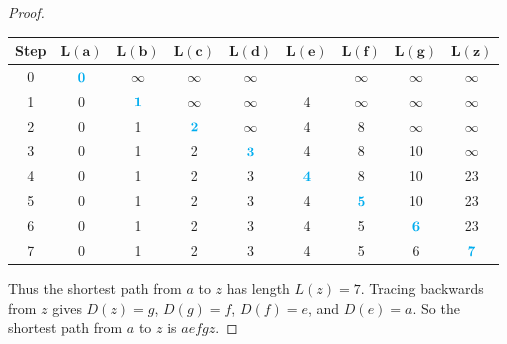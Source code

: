 \documentclass[14pt]{extarticle}
\newcommand{\cy}{\color{cyan}}
\begin{document}
\begin{proof}
\begin{center}
        \begin{tabular}{|c|c|c|c|c|c|c|c|c|}
            \hline
            {\bf \cy Step} & {\cy \(\bm{L(a)}\)} & {\cy\(\bm{L(b)}\)} & {\cy\(\bm{L(c)}\)} & {\cy\(\bm{L(d)}\)} & {\cy\(\bm{L(e)}\)} & {\cy\(\bm{L(f)}\)} & {\cy\(\bm{L(g)}\)} & {\cy\(\bm{L(z)}\)} \\
            \hline
            0              & \({\cy \bm{0}}\)    & \(\infty\)         & \(\infty\)         & \(\infty\)         &                    & \(\infty\)         & \(\infty\)         & \(\infty\)         \\
            1              & 0                   & \({\cy \bm{1}}\)   & \(\infty\)         & \(\infty\)         & 4                  & \(\infty\)         & \(\infty\)         & \(\infty\)         \\
            2              & 0                   & 1                  & \({\cy \bm{2}}\)   & \(\infty\)         & 4                  & 8                  & \(\infty\)         & \(\infty\)         \\
            3              & 0                   & 1                  & 2                  & \({\cy \bm{3}}\)   & 4                  & 8                  & 10                 & \(\infty\)         \\
            4              & 0                   & 1                  & 2                  & 3                  & \({\cy \bm{4}}\)   & 8                  & 10                 & 23                 \\
            5              & 0                   & 1                  & 2                  & 3                  & 4                  & \({\cy \bm{5}}\)   & 10                 & 23                 \\
            6              & 0                   & 1                  & 2                  & 3                  & 4                  & 5                  & \({\cy \bm{6}}\)   & 23                 \\
            7              & 0                   & 1                  & 2                  & 3                  & 4                  & 5                  & 6                  & \({\cy \bm{7}}\)   \\
            \hline
        \end{tabular}
    \end{center}

    Thus the shortest path from \(a\) to \(z\) has length \(L(z) = 7\). Tracing backwards from \(z\) gives \(D(z) = g\),
    \(D(g) = f\), \(D(f) = e\), and \(D(e) = a\). So the shortest path from \(a\) to \(z\) is \(aefgz\).
\end{proof}
\end{document}

